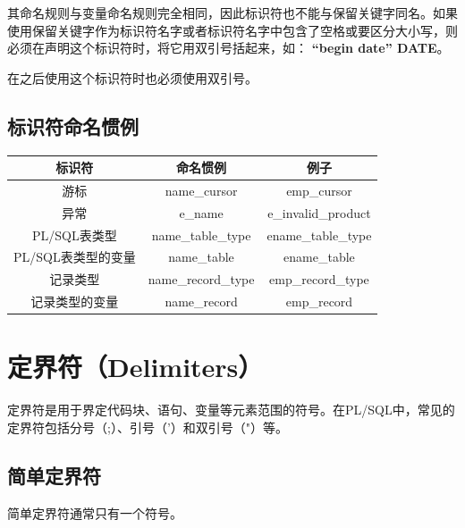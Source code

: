 \documentclass[11pt, a4paper, oneside, UTF8]{ctexbook}
\let\kaishu\relax %
\begin{document}
其命名规则与变量命名规则完全相同，因此标识符也不能与保留关键字同名。如果使用保留关键字作为标识符名字或者标识符名字中包含了空格或要区分大小写，则必须在声明这个标识符时，将它用双引号括起来，如：  {\bfseries\kaishu “begin date” DATE}。

在之后使用这个标识符时也必须使用双引号。

\subsection{标识符命名惯例}

\begin{center}
  \begin{minipage}{\textwidth}
    \centering %
    \begin{tabular}{|c|c|c|} %
      \hline %
      \textbf{标识符} & \textbf{命名惯例}  & \textbf{例子} \\
      \hline
      游标 & name\_cursor & emp\_cursor \\
      异常 & e\_name & e\_invalid\_product \\
      PL/SQL表类型 & name\_table\_type & ename\_table\_type \\
      PL/SQL表类型的变量 & name\_table  & ename\_table \\
      记录类型 & name\_record\_type & emp\_record\_type \\
      记录类型的变量 & name\_record & emp\_record \\
      \hline
    \end{tabular}
    \captionsetup{hypcap=false}
    \label{tab:标识符命名惯例} %
  \end{minipage}
\end{center}

\section{定界符（Delimiters）}
定界符是用于界定代码块、语句、变量等元素范围的符号。在PL/SQL中，常见的定界符包括分号（;）、引号（'）和双引号（"）等。
\subsection{简单定界符}
简单定界符通常只有一个符号。
\end{document}
